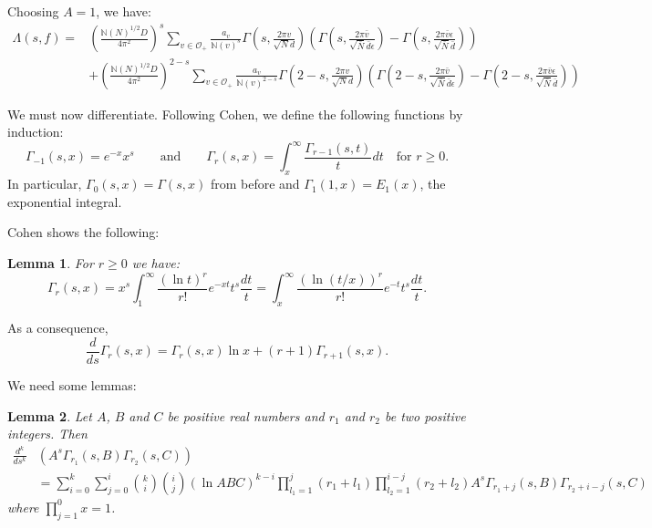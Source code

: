 \documentclass{article}
\theoremstyle{plain}
\newtheorem{lemma}{Lemma}
\begin{document}
{Choosing $A=1$, we have:
\begin{equation*}
\begin{split}
\Lambda(s,f)=& \left(\frac{\mathbb{N}(N)^{1/2}D}{4\pi^2}\right)^s \sum_{v \in \mathcal{O}_+} \frac{a_v}{\mathbb{N}(v)^s} \Gamma\left(s, \frac{2\pi v }{\sqrt{N}d}\right) \left(\Gamma\left(s,\frac{2 \pi \bar{v}}{\sqrt{\bar{N}}\bar{d} \epsilon} \right)-  \Gamma\left(s,\frac{2 \pi \bar{v}\epsilon}{\sqrt{\bar{N}}\bar{d} } \right) \right) \\
&+ \left(\frac{\mathbb{N}(N)^{1/2}D}{4\pi^2}\right)^{2-s}\sum_{v \in \mathcal{O}_+} \frac{a_v}{\mathbb{N}(v)^{2-s}} \Gamma\left(2-s, \frac{2\pi v }{\sqrt{N}d}\right) \left(\Gamma\left(2-s,\frac{2 \pi \bar{v}}{\sqrt{\bar{N}}\bar{d} \epsilon} \right)-  \Gamma\left(2-s,\frac{2 \pi \bar{v}\epsilon}{\sqrt{\bar{N}}\bar{d} } \right) \right)
\end{split}
\end{equation*}

We must now differentiate. Following Cohen, we define the following functions by induction:
\begin{equation*}
\Gamma_{-1}(s,x)= e^{-x}x^s \qquad \text{and} \qquad \Gamma_r(s,x) = \int_x^{\infty}\frac{\Gamma_{r-1}(s,t)}{t}dt \quad \text{for } r\geq 0.
\end{equation*}
In particular, $\Gamma_0(s,x)=\Gamma(s,x)$ from before and $\Gamma_1(1,x)=E_1(x)$, the exponential integral.

Cohen shows the following:
\begin{lemma}
For $r \geq 0$ we have:
\begin{equation*}
\Gamma_r(s,x)=x^s \int_1^{\infty} \frac{(\ln t)^r}{r!}e^{-xt} t^s \frac{dt}{t}=\int_x^{\infty} \frac{(\ln(t/x))^r}{r!}e^{-t}t^s \frac{dt}{t}.
\end{equation*}
\end{lemma}

As a consequence, 
\begin{equation*}
\frac{d}{ds} \Gamma_r(s,x)= \Gamma_r(s,x) \ln x +(r+1)\Gamma_{r+1}(s,x).
\end{equation*}

We need some lemmas:
\begin{lemma}
Let $A$, $B$ and $C$ be positive real numbers and $r_1$ and $r_2$ be two positive integers. Then
\begin{equation*}
\begin{split}
\frac{d^k}{ds^k} & \left( A^{s} \Gamma_{r_1}(s,B) \Gamma_{r_2}(s, C)\right)\\
&= \sum_{i=0}^{k}\sum_{j=0}^{i}\binom{k}{i}\binom{i}{j} (\ln ABC)^{k-i} \prod_{l_1=1}^{j} (r_1+l_1) \prod_{l_2=1}^{i-j}(r_2+l_2)
A^{s} \Gamma_{r_1+j}(s,B) \Gamma_{r_2+i-j}(s, C)
\end{split}
\end{equation*}
where $\prod_{j=1}^{0} x =1$.
\end{lemma}

}
\end{document}

